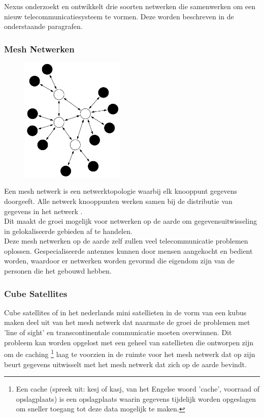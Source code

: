 \documentclass[11pt]{article}
\begin{document}
Nexus onderzoekt en ontwikkelt drie soorten netwerken die samenwerken om een ​​nieuw telecommunicatiesysteem te vormen. Deze worden beschreven in de onderstaande paragrafen.

\newpage

\subsubsection{Mesh Netwerken}

\begin{figure}
    \centering
    \vspace{-20pt}
    \includegraphics[width=0.44\textwidth]{mesh.png}
\end{figure}

Een mesh netwerk is een netwerktopologie waarbij elk knooppunt gegevens doorgeeft. Alle netwerk knooppunten werken samen bij de distributie van gegevens in het netwerk \cite{meshnetworks}.\\ 

\noindent 
Dit maakt de groei mogelijk voor netwerken op de aarde om gegevensuitwisseling in gelokaliseerde gebieden af ​​te handelen.\\

\noindent Deze mesh netwerken op de aarde zelf zullen veel telecommunicatie problemen oplossen. Gespecialiseerde antennes kunnen door mensen aangekocht en bedient worden, waardoor er netwerken worden gevormd die eigendom zijn van de personen die het gebouwd hebben.

\subsubsection{Cube Satellites}

Cube satellites of in het nederlands mini satellieten in de vorm van een kubus maken deel uit van het mesh netwerk dat naarmate de groei de problemen met 'line of sight' en transcontinentale communicatie moeten overwinnen. Dit probleem kan worden opgelost met een geheel van satellieten die ontworpen zijn om de caching \footnote{Een cache (spreek uit: kesj of kasj, van het Engelse woord 'cache', voorraad of opslagplaats) is een opslagplaats waarin gegevens tijdelijk worden opgeslagen om sneller toegang tot deze data mogelijk te maken.\cite{caching}} laag te voorzien in de ruimte voor het mesh netwerk dat op zijn beurt gegevens uitwisselt met het mesh netwerk dat zich op de aarde bevindt.
\end{document}
